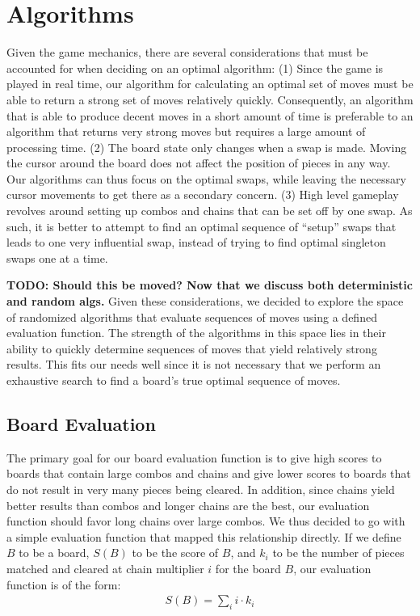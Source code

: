 \documentclass[12pt]{IEEEtran}
\begin{document}
\section{Algorithms}
Given the game mechanics, there are several considerations that must be accounted for when deciding on an optimal algorithm:
(1) Since the game is played in real time, our algorithm for calculating an optimal set of moves must be able to return a strong set of moves relatively quickly. Consequently, an algorithm that is able to produce decent moves in a short amount of time is preferable to an algorithm that returns very strong moves but requires a large amount of processing time.
(2) The board state only changes when a swap is made. Moving the cursor around the board does not affect the position of pieces in any way. Our algorithms can thus focus on the optimal swaps, while leaving the necessary cursor movements to get there as a secondary concern.
(3) High level gameplay revolves around setting up combos and chains that can be set off by one swap. As such, it is better to attempt to find an optimal sequence of ``setup'' swaps that leads to one very influential swap, instead of trying to find optimal singleton swaps one at a time.

\textbf{TODO: Should this be moved? Now that we discuss both deterministic and random algs.} Given these considerations, we decided to explore the space of randomized algorithms that evaluate sequences of moves using a defined evaluation function. The strength of the algorithms in this space lies in their ability to quickly determine sequences of moves that yield relatively strong results. This fits our needs well since it is not necessary that we perform an exhaustive search to find a board's true optimal sequence of moves.

\subsection{Board Evaluation}

The primary goal for our board evaluation function is to give high scores to boards that contain large combos and chains and give lower scores to boards that do not result in very many pieces being cleared. In addition, since chains yield better results than combos and longer chains are the best, our evaluation function should favor long chains over large combos. We thus decided to go with a simple evaluation function that mapped this relationship directly. If we define $B$ to be a board, $S(B)$ to be the score of $B$, and $k_i$ to be the number of pieces matched and cleared at chain multiplier $i$ for the board $B$, our evaluation function is of the form:
\begin{align*}
S(B) = \sum_{i}i \cdot k_i
\end{align*}
\end{document}
